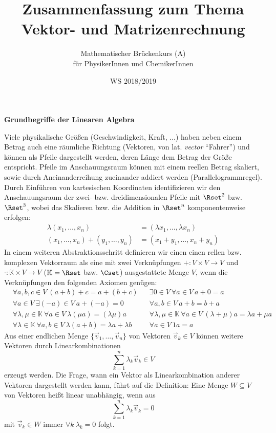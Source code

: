 \documentclass[a4paper,10pt]{article}
\title{Zusammenfassung zum Thema \\ Vektor- und Matrizenrechnung}
\author{Mathematischer Brückenkurs (A)\\für PhysikerInnen und ChemikerInnen}
\date{WS 2018/2019}
\begin{document}
\parindent0pt
\maketitle

{\bf Grundbegriffe der Linearen Algebra}

Viele physikalische Größen (Geschwindigkeit, Kraft, $\ldots$) haben neben
einem Betrag auch eine räumliche Richtung
(Vektoren, von lat. {\em vector} ``Fahrer'')
und können als Pfeile dargestellt werden,
deren Länge dem Betrag der Größe entspricht.
Pfeile im Anschauungsraum können mit einem reellen Betrag skaliert, sowie
durch Aneinanderreihung zueinander addiert werden (Parallelogrammregel).
Durch Einführen von kartesischen Koordinaten identifizieren wir den
Anschauungsraum der zwei- bzw. dreidimensionalen Pfeile mit
$\Rset^2$ bzw. $\Rset^3$,
wobei das Skalieren bzw. die Addition in $\Rset^n$ komponentenweise erfolgen:
\begin{align*}
\lambda (x_1,\ldots,x_n) &= (\lambda x_1,\ldots,\lambda x_n) \\
(x_1,\ldots,x_n) + (y_1,\ldots,y_n) &= (x_1+y_1,\ldots,x_n+y_n)
\end{align*}
In einem weiteren Abstraktionsschritt definieren wir einen
einen rellen bzw. komplexen Vektorraum als
eine mit zwei Verknüpfungen $+:V\times V\to V$ und
$\cdot:{\mathbb{K}}\times V\to V$ (${\mathbb{K}}=\Rset$ bzw. $\Cset$)
ausgestattete Menge $V$, wenn die
Verknüpfungen den folgenden Axiomen genügen:
\begin{align*}
&\forall a,b,c\in V~(a+b)+c = a+(b+c)
&&\exists 0\in V~\forall a\in V~ a+0=a \\
&\forall a\in V~\exists (-a)\in V~ a+(-a)=0
&&\forall a,b\in V~ a+b=b+a\\
&\forall \lambda,\mu\in\mathbb{K}~\forall a\in V~ \lambda(\mu a)=(\lambda\mu)a
&&\forall \lambda,\mu\in\mathbb{K}~\forall a\in V~ (\lambda+\mu)a=\lambda a+\mu a \\
&\forall \lambda\in\mathbb{K}~\forall a,b\in V~ \lambda(a+b)=\lambda a+\lambda b
&&\forall a\in V~ 1a=a
\end{align*}
Aus einer endlichen Menge $\{\vec{v}_1,\ldots,\vec{v}_n\}$ von
Vektoren $\vec{v}_k\in V$
können weitere Vektoren durch Linearkombinationen
\[
\sum_{k=1}^n \lambda_k \vec{v}_k \in V
\]
erzeugt werden.
Die Frage, wann ein Vektor als Linearkombination anderer Vektoren
dargestellt werden kann, führt auf die Definition: Eine Menge $W\subseteq V$
von Vektoren heißt linear unabhängig, wenn aus
\[
\sum_{k=1}^n \lambda_k \vec{v}_k = 0
\]
mit $\vec{v}_k\in W$ immer $\forall k~\lambda_k=0$ folgt.
\end{document}
